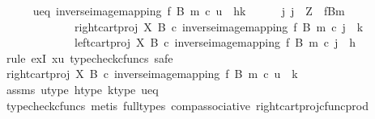 \begin{isabellebody}
\ \ \ \ \isamarkupfalse%
\ u{\isacharunderscore}{\kern0pt}eq{\isacharcolon}{\kern0pt}\ {\isachardoublequoteopen}inverse{\isacharunderscore}{\kern0pt}image{\isacharunderscore}{\kern0pt}mapping\ f\ B\ m\ {\isasymcirc}\isactrlsub c\ u\ {\isacharequal}{\kern0pt}\ {\isasymlangle}h{\isacharcomma}{\kern0pt}k{\isasymrangle}{\isachardoublequoteclose}\isanewline
\isanewline
\ \ \ \ \isamarkupfalse%
\ {\isachardoublequoteopen}{\isasymexists}j{\isachardot}{\kern0pt}\ j\ {\isacharcolon}{\kern0pt}\ Z\ {\isasymrightarrow}\ f\isactrlsup {\isacharminus}{\kern0pt}B{\isasymrparr}\isactrlbsub m\isactrlesub \ {\isasymand}\isanewline
\ \ \ \ \ \ \ \ \ \ \ \ \ {\isacharparenleft}{\kern0pt}right{\isacharunderscore}{\kern0pt}cart{\isacharunderscore}{\kern0pt}proj\ X\ B\ {\isasymcirc}\isactrlsub c\ inverse{\isacharunderscore}{\kern0pt}image{\isacharunderscore}{\kern0pt}mapping\ f\ B\ m{\isacharparenright}{\kern0pt}\ {\isasymcirc}\isactrlsub c\ j\ {\isacharequal}{\kern0pt}\ k\ {\isasymand}\isanewline
\ \ \ \ \ \ \ \ \ \ \ \ \ {\isacharparenleft}{\kern0pt}left{\isacharunderscore}{\kern0pt}cart{\isacharunderscore}{\kern0pt}proj\ X\ B\ {\isasymcirc}\isactrlsub c\ inverse{\isacharunderscore}{\kern0pt}image{\isacharunderscore}{\kern0pt}mapping\ f\ B\ m{\isacharparenright}{\kern0pt}\ {\isasymcirc}\isactrlsub c\ j\ {\isacharequal}{\kern0pt}\ h{\isachardoublequoteclose}\isanewline
\ \ \ \ \isamarkupfalse%
\ {\isacharparenleft}{\kern0pt}rule\ exI{\isacharbrackleft}{\kern0pt}\ x{\isacharequal}{\kern0pt}u{\isacharbrackright}{\kern0pt}{\isacharcomma}{\kern0pt}\ typecheck{\isacharunderscore}{\kern0pt}cfuncs{\isacharcomma}{\kern0pt}\ safe{\isacharparenright}{\kern0pt}\isanewline
\isanewline
\ \ \ \ \ \ \isamarkupfalse%
\ {\isachardoublequoteopen}{\isacharparenleft}{\kern0pt}right{\isacharunderscore}{\kern0pt}cart{\isacharunderscore}{\kern0pt}proj\ X\ B\ {\isasymcirc}\isactrlsub c\ inverse{\isacharunderscore}{\kern0pt}image{\isacharunderscore}{\kern0pt}mapping\ f\ B\ m{\isacharparenright}{\kern0pt}\ {\isasymcirc}\isactrlsub c\ u\ {\isacharequal}{\kern0pt}\ k{\isachardoublequoteclose}\isanewline
\ \ \ \ \ \ \ \ \isamarkupfalse%
\ assms\ u{\isacharunderscore}{\kern0pt}type\ h{\isacharunderscore}{\kern0pt}type\ k{\isacharunderscore}{\kern0pt}type\ u{\isacharunderscore}{\kern0pt}eq\isanewline
\ \ \ \ \ \ \ \ \isamarkupfalse%
\ {\isacharparenleft}{\kern0pt}typecheck{\isacharunderscore}{\kern0pt}cfuncs{\isacharcomma}{\kern0pt}\ metis\ {\isacharparenleft}{\kern0pt}full{\isacharunderscore}{\kern0pt}types{\isacharparenright}{\kern0pt}\ comp{\isacharunderscore}{\kern0pt}associative{}\ right{\isacharunderscore}{\kern0pt}cart{\isacharunderscore}{\kern0pt}proj{\isacharunderscore}{\kern0pt}cfunc{\isacharunderscore}{\kern0pt}prod{\isacharparenright}{\kern0pt}\isanewline

\end{isabellebody}
